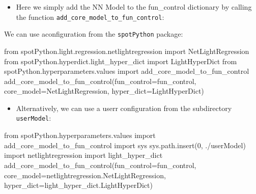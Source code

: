 \documentclass[
  letterpaper,
  DIV=11,
  numbers=noendperiod]{scrreprt}
\newenvironment{Shaded}{\begin{snugshade}}{\end{snugshade}}
\newcommand{\DecValTok}[1]{\textcolor[rgb]{0.68,0.00,0.00}{#1}}
\newcommand{\ImportTok}[1]{\textcolor[rgb]{0.00,0.46,0.62}{#1}}
\newcommand{\NormalTok}[1]{\textcolor[rgb]{0.00,0.23,0.31}{#1}}
\newcommand{\OperatorTok}[1]{\textcolor[rgb]{0.37,0.37,0.37}{#1}}
\newcommand{\StringTok}[1]{\textcolor[rgb]{0.13,0.47,0.30}{#1}}
\providecommand{\tightlist}{%
  \setlength{\itemsep}{0pt}\setlength{\parskip}{0pt}}\usepackage{longtable,booktabs,array}
\begin{document}
\begin{itemize}
\tightlist
\item
  Here we simply add the NN Model to the fun\_control dictionary by
  calling the function \texttt{add\_core\_model\_to\_fun\_control}:
\end{itemize}

We can use aconfiguration from the \texttt{spotPython} package:

\begin{Shaded}
\begin{Highlighting}[]
\ImportTok{from}\NormalTok{ spotPython.light.regression.netlightregression }\ImportTok{import}\NormalTok{ NetLightRegression}
\ImportTok{from}\NormalTok{ spotPython.hyperdict.light\_hyper\_dict }\ImportTok{import}\NormalTok{ LightHyperDict}
\ImportTok{from}\NormalTok{ spotPython.hyperparameters.values }\ImportTok{import}\NormalTok{ add\_core\_model\_to\_fun\_control}
\NormalTok{add\_core\_model\_to\_fun\_control(fun\_control}\OperatorTok{=}\NormalTok{fun\_control,}
\NormalTok{                              core\_model}\OperatorTok{=}\NormalTok{NetLightRegression,}
\NormalTok{                              hyper\_dict}\OperatorTok{=}\NormalTok{LightHyperDict)}
\end{Highlighting}
\end{Shaded}

\begin{itemize}
\tightlist
\item
  Alternatively, we can use a userr configuration from the subdirectory
  \texttt{userModel}:
\end{itemize}

\begin{Shaded}
\begin{Highlighting}[]
\ImportTok{from}\NormalTok{ spotPython.hyperparameters.values }\ImportTok{import}\NormalTok{ add\_core\_model\_to\_fun\_control}
\ImportTok{import}\NormalTok{ sys}
\NormalTok{sys.path.insert(}\DecValTok{0}\NormalTok{, }\StringTok{\textquotesingle{}./userModel\textquotesingle{}}\NormalTok{)}
\ImportTok{import}\NormalTok{ netlightregression}
\ImportTok{import}\NormalTok{ light\_hyper\_dict}
\NormalTok{add\_core\_model\_to\_fun\_control(fun\_control}\OperatorTok{=}\NormalTok{fun\_control,}
\NormalTok{                              core\_model}\OperatorTok{=}\NormalTok{netlightregression.NetLightRegression,}
\NormalTok{                              hyper\_dict}\OperatorTok{=}\NormalTok{light\_hyper\_dict.LightHyperDict)}
\end{Highlighting}
\end{Shaded}
\end{document}
